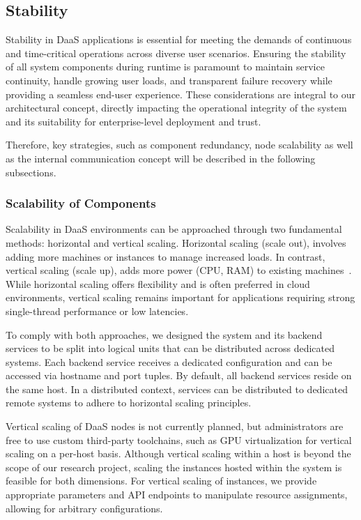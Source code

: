\documentclass[runningheads]{llncs}
\begin{document}
\subsection{Stability}
Stability in DaaS applications is essential
for meeting the demands of continuous and time-critical operations
across diverse user scenarios.
Ensuring the stability of all system components during runtime is paramount
to maintain service continuity, handle growing user loads,
and transparent failure recovery while providing a seamless end-user experience.
These considerations are integral to our architectural concept,
directly impacting the operational integrity of the system
and its suitability for enterprise-level deployment and trust.

Therefore, key strategies, such as component redundancy, node scalability
as well as the internal communication concept
will be described in the following subsections.

\subsubsection{Scalability of Components}
Scalability in DaaS environments
can be approached through two fundamental methods: horizontal and vertical scaling.
Horizontal scaling (scale out), involves adding more machines or instances
to manage increased loads.
In contrast, vertical scaling (scale up),
adds more power (CPU, RAM) to existing 
machines~\cite{vaquero2011dynamically}.
While horizontal scaling offers flexibility
and is often preferred in cloud environments,
vertical scaling remains important for applications
requiring strong single-thread performance or low latencies.

To comply with both approaches,
we designed the system and its backend services
to be split into logical units that can be distributed across dedicated systems.
Each backend service receives a dedicated configuration
and can be accessed via hostname and port tuples.
By default, all backend services reside on the same host.
In a distributed context, services can be distributed to dedicated remote systems
to adhere to horizontal scaling principles.

Vertical scaling of DaaS nodes is not currently planned,
but administrators are free to use custom third-party toolchains,
such as GPU virtualization for vertical scaling on a per-host basis.
Although vertical scaling within a host
is beyond the scope of our research project,
scaling the instances hosted within the system is feasible for both dimensions.
For vertical scaling of instances, we provide appropriate parameters
and API endpoints to manipulate resource assignments,
allowing for arbitrary configurations.
\end{document}
